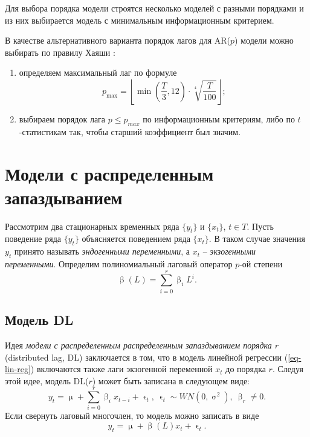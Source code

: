 \documentclass[a4paper, 14pt]{extreport}
\numberwithin{equation}{section}
\renewcommand{\leq}{\leqslant}
\renewcommand{\beta}{\upbeta}
\renewcommand{\epsilon}{\upvarepsilon}
\renewcommand{\mu}{\upmu}
\renewcommand{\sigma}{\upsigma}
\numberwithin{equation}{section}
\begin{document}
	Для выбора порядка модели строятся несколько моделей с разными порядками и из них выбирается модель с минимальным информационным критерием. 
	
	В качестве альтернативного варианта порядок лагов для AR($p$) модели можно выбирать по правилу Хаяши \cite{8}:
	\begin{enumerate}
		\item определяем максимальный лаг по формуле \begin{equation}
			p_{\max}=\left\lfloor \min\left(\dfrac  T3,12\right)\cdot\sqrt[4]{\frac{T}{100}}\right\rfloor;
		\end{equation}
		\item выбираем порядок лага $p\leq p_{max}$ по информационным критериям, либо по $t$-статистикам так, чтобы старший коэффициент был значим.
	\end{enumerate}
	
	\section{Модели с распределенным запаздыванием}
	Рассмотрим два стационарных временных ряда $\{y_t\}$ и $\{x_t\}$, $t \in T$. Пусть поведение ряда $\{y_t\}$  объясняется поведением ряда $\{x_t\}$. В таком случае значения $y_t$ принято называть \textit{эндогенными переменными}, а $x_t$ -- \textit{экзогенными переменными}.
	Определим полиномиальный лаговый оператор $p$-ой степени
	\begin{equation}
		 \beta(L) = \sum_{i=0}^{r} \beta_i L^i.
	\end{equation}
	\subsection{Модель DL}
	Идея \textit{модели с распределенным распределенным запаздыванием порядка $r$} (distributed lag, DL) заключается в том, что в модель линейной регрессии (\ref{eq-lin-reg}) включаются также лаги экзогенной переменной $x_t$ до порядка $r$.
	Следуя этой идее, модель DL($r$) может быть записана в следующем виде:
	\begin{equation}\label{eq:dl}
		y_t = \mu + \sum_{i=0}^{r} \beta_i x_{t-i} + \epsilon_t,\ \epsilon_t\sim WN(0,\sigma^2),\ \beta_r\ne 0.
	\end{equation}
	Если свернуть лаговый многочлен, то модель можно записать в виде
	\begin{equation}
		y_t = \mu + \beta(L)x_t + \epsilon_t.
	\end{equation}
\end{document}
